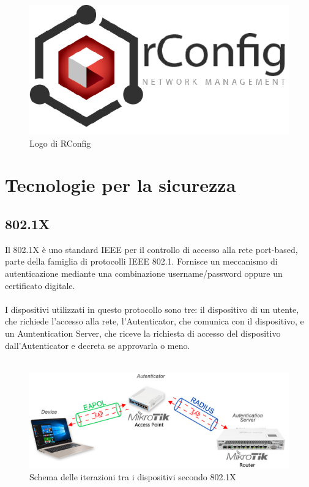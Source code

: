 \documentclass[Tesi.tex]{subfiles}
\begin{document}
\begin{figure}[H]
	\centering
	\includegraphics[width=0.34\linewidth]{"images/logo/rConfig_logo"}
	\caption{Logo di RConfig}
	\label{fig:Logo di RConfig}
\end{figure}

\newpage
\section{Tecnologie per la sicurezza}
\subsection{802.1X}
Il 802.1X è uno standard IEEE per il controllo di accesso alla rete port-based, parte della famiglia di protocolli IEEE 802.1. Fornisce un meccanismo di autenticazione mediante una combinazione username/password oppure un certificato digitale. \\\\
I dispositivi utilizzati in questo protocollo sono tre: il dispositivo di un utente, che richiede l'accesso alla rete, l'Autenticator, che comunica con il dispositivo, e un Auntentication Server, che riceve la richiesta di accesso del dispositivo dall'Autenticator e decreta se approvarla o meno. \\\\
\begin{figure}[H]
	\centering
	\includegraphics[width=1\linewidth]{"images/Schema_tecnologie"}
	\caption{Schema delle iterazioni tra i dispositivi secondo 802.1X}
	\label{fig:Schema delle iterazioni tra i dispositivi secondo 802.1X}
\end{figure}
\end{document}
